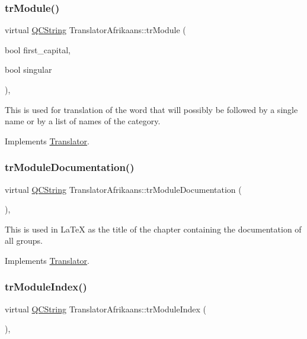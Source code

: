 \subsubsection{\texorpdfstring{trModule()}{trModule()}}
{\footnotesize\ttfamily virtual \mbox{\hyperlink{class_q_c_string}{Q\+C\+String}} Translator\+Afrikaans\+::tr\+Module (\begin{DoxyParamCaption}\item[{bool}]{first\+\_\+capital,  }\item[{bool}]{singular }\end{DoxyParamCaption})\hspace{0.3cm}{\ttfamily [inline]}, {\ttfamily [virtual]}}

This is used for translation of the word that will possibly be followed by a single name or by a list of names of the category. 

Implements \mbox{\hyperlink{class_translator}{Translator}}.

\mbox{\label{class_translator_afrikaans_a298f1d88c90eb327e8b0c5ec4e827f5c}} 
\subsubsection{\texorpdfstring{trModuleDocumentation()}{trModuleDocumentation()}}
{\footnotesize\ttfamily virtual \mbox{\hyperlink{class_q_c_string}{Q\+C\+String}} Translator\+Afrikaans\+::tr\+Module\+Documentation (\begin{DoxyParamCaption}{ }\end{DoxyParamCaption})\hspace{0.3cm}{\ttfamily [inline]}, {\ttfamily [virtual]}}

This is used in La\+TeX as the title of the chapter containing the documentation of all groups. 

Implements \mbox{\hyperlink{class_translator}{Translator}}.

\mbox{\label{class_translator_afrikaans_a2391ea748d5eeac926a0ccf6421daf69}} 
\subsubsection{\texorpdfstring{trModuleIndex()}{trModuleIndex()}}
{\footnotesize\ttfamily virtual \mbox{\hyperlink{class_q_c_string}{Q\+C\+String}} Translator\+Afrikaans\+::tr\+Module\+Index (\begin{DoxyParamCaption}{ }\end{DoxyParamCaption})\hspace{0.3cm}{\ttfamily [inline]}, {\ttfamily [virtual]}}

